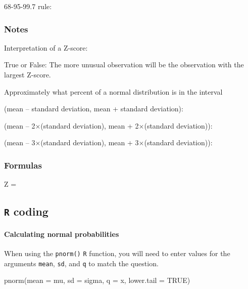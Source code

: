 \documentclass[
]{report}
\newenvironment{Shaded}{\begin{snugshade}}{\end{snugshade}}
\newcommand{\AttributeTok}[1]{\textcolor[rgb]{0.77,0.63,0.00}{#1}}
\newcommand{\ConstantTok}[1]{\textcolor[rgb]{0.00,0.00,0.00}{#1}}
\newcommand{\FunctionTok}[1]{\textcolor[rgb]{0.00,0.00,0.00}{#1}}
\newcommand{\NormalTok}[1]{#1}
\newcommand{\rgs}{\vspace{12pt}} %
\newcommand{\rgi}{\hspace{24pt}}  %
\begin{document}
68-95-99.7 rule:
\rgs

\hypertarget{notes-17}{%
\subsubsection*{Notes}\label{notes-17}}

Interpretation of a Z-score:
\rgs

True or False: The more unusual observation will be the observation with the largest Z-score.

Approximately what percent of a normal distribution is in the interval

\rgi (mean -- standard deviation, mean + standard deviation):
\rgs

\rgi (mean -- 2\(\times\)(standard deviation), mean + 2\(\times\)(standard deviation)):
\rgs

\rgi (mean -- 3\(\times\)(standard deviation), mean + 3\(\times\)(standard deviation)):
\rgs

\hypertarget{formulas-1}{%
\subsubsection*{Formulas}\label{formulas-1}}

Z =
\rgs

\hypertarget{r-coding}{%
\subsection*{\texorpdfstring{\texttt{R} coding}{R coding}}\label{r-coding}}

\hypertarget{calculating-normal-probabilities}{%
\paragraph*{Calculating normal probabilities}\label{calculating-normal-probabilities}}

When using the \texttt{pnorm()} \texttt{R} function, you will need to enter values for the arguments \texttt{mean}, \texttt{sd}, and \texttt{q} to match the question.

\begin{Shaded}
\begin{Highlighting}[]
\FunctionTok{pnorm}\NormalTok{(}\AttributeTok{mean =}\NormalTok{ mu, }\AttributeTok{sd =}\NormalTok{ sigma, }\AttributeTok{q =}\NormalTok{ x, }\AttributeTok{lower.tail =} \ConstantTok{TRUE}\NormalTok{)}
\end{Highlighting}
\end{Shaded}
\end{document}
